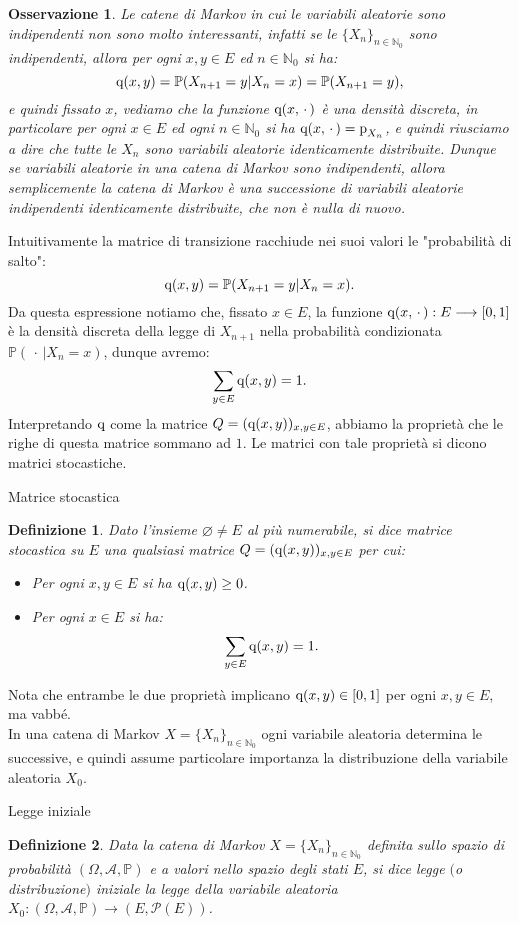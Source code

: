 \documentclass[11pt]{book}
\theoremstyle{Definizione}
\newtheorem*{mydef}{Definizione}
\theoremstyle{TeoremaProposizioneLemmaCorollario}
\theoremstyle{OsservazioneNota}
\newtheorem{myobs}{Osservazione}[section]
\newcommand{\N}{\mathbb{N}}
\renewcommand{\P}{\mathbb{P}}
\newcommand{\p}{\textup{p}}
\newcommand{\q}{\textup{q}}
\begin{document}
\begin{myobs}
Le catene di Markov in cui le variabili aleatorie sono indipendenti non sono molto interessanti, infatti se le $\{X_n\}_{n \in \N_0}$ sono indipendenti, allora per ogni $x,y\in E$ ed $n \in \N_0$ si ha:
$$
\q(x,y) = \P(X_{n+1} = y| X_n = x) = \P(X_{n+1} = y),
$$
e quindi fissato $x$, vediamo che la funzione $\q(x,\,\cdot\,)$ è una densità discreta, in particolare per ogni $x\in E$ ed ogni $n\in \N_0$ si ha $\q(x,\,\cdot\,) = \p_{X_n}$, e quindi riusciamo a dire che tutte le $X_{n}$ sono variabili aleatorie identicamente distribuite. Dunque se variabili aleatorie in una catena di Markov sono indipendenti, allora semplicemente la catena di Markov è una successione di variabili aleatorie indipendenti identicamente distribuite, che non è nulla di nuovo.
\end{myobs}
Intuitivamente la matrice di transizione racchiude nei suoi valori le "probabilità di salto":
$$
\q(x,y) = \P(X_{n+1}= y| X_{n} = x).
$$
Da questa espressione notiamo che, fissato $x\in E$, la funzione $\q(x,\,\cdot\,):E\longrightarrow [0,1]$ è la densità discreta della legge di $X_{n+1}$ nella probabilità condizionata $\P(\,\cdot\,|X_n = x)$, dunque avremo:
$$
\sum_{y\in E} \q(x,y) = 1.
$$
Interpretando $\q$ come la matrice $Q = (\q(x,y))_{x,y\in E}$, abbiamo la proprietà che le righe di questa matrice sommano ad $1$. Le matrici con tale proprietà si dicono matrici stocastiche.
\begin{boxdef}{Matrice stocastica}
\begin{mydef}
Dato l'insieme $\varnothing \neq E$ al più numerabile, si dice matrice stocastica su $E$ una qualsiasi matrice $Q = (\q(x,y))_{x,y\in E}$ per cui:
\begin{itemize}
\item Per ogni $x,y\in E$ si ha $\q(x,y) \geq 0$.
\item Per ogni $x\in E$ si ha:
$$
\sum_{y\in E} \q(x,y) = 1.
$$
\end{itemize}
\end{mydef}
\end{boxdef}
\noindent
Nota che entrambe le due proprietà implicano $\q(x,y)\in [0,1]$ per ogni $x,y\in E$, ma vabbé.\\
In una catena di Markov $X = \{X_n\}_{n\in \N_0}$ ogni variabile aleatoria determina le successive, e quindi assume particolare importanza la distribuzione della variabile aleatoria $X_0$.
\begin{boxdef}{Legge iniziale}
\begin{mydef}
Data la catena di Markov $X = \{X_n\}_{n\in \N_0}$ definita sullo spazio di probabilità $(\Omega,\mathcal{A},\P)$ e a valori nello spazio degli stati $E$, si dice legge $($o distribuzione$)$ iniziale la legge della variabile aleatoria $X_0:(\Omega,\mathcal{A},\P)\longrightarrow (E,\mathcal{P}(E))$.
\end{mydef}
\end{boxdef}
\end{document}

